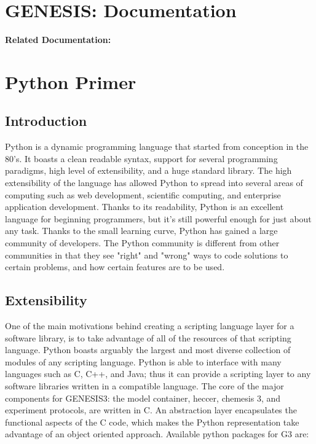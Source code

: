 \documentclass[12pt]{article}
\begin{document}
\section*{GENESIS: Documentation}

{\bf Related Documentation:}

\section*{Python Primer}


\subsection*{Introduction}

Python is a dynamic programming language that started from conception in the 80's. It boasts a clean readable syntax, support for several programming paradigms, high level of extensibility, and a huge standard library. The high extensibility of the language has allowed Python to spread into several areas of computing such as web development, scientific computing, and enterprise application development. Thanks to its readability, Python is an excellent language for beginning programmers, but it's still powerful enough for just about any task. 
	Thanks to the small learning curve, Python has gained a large community of developers. The Python community is different from other communities in that they see "right" and "wrong" ways to code solutions to certain problems, and how certain features are to be used.

\subsection*{Extensibility}

One of the main motivations behind creating a scripting language layer for a software library, is to take advantage of all of the resources of that scripting language. Python boasts arguably the largest and most diverse collection of modules of any scripting language. Python is able to interface with many languages such as C, C++, and Java; thus it can provide a scripting layer to any software libraries written in a compatible language. The core of the major components for GENESIS3: the model container, heccer, chemesis 3, and experiment protocols, are written in C. An abstraction layer encapsulates the functional aspects of the C code, which makes the Python representation take advantage of an object oriented approach. Available python packages for G3 are: 
\end{document}
